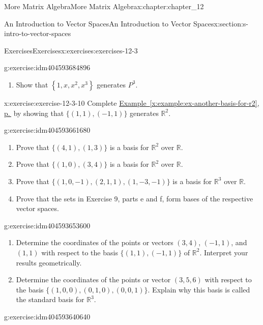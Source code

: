 \documentclass[twoside,10pt,]{book}
\newcommand{\xreffont}{\relax}
\numberwithin{equation}{section}
\begin{document}
\begin{chapterptx}{More Matrix Algebra}{}{More Matrix Algebra}{}{}{x:chapter:chapter_12}
\begin{sectionptx}{An Introduction to Vector Spaces}{}{An Introduction to Vector Spaces}{}{}{x:section:s-intro-to-vector-spaces}
\begin{exercises-subsection}{Exercises}{}{Exercises}{}{}{x:exercises:exercises-12-3}
\begin{divisionexercise}{9}{}{}{g:exercise:idm404593684896}
\begin{enumerate}[label=(\alph*)]
\begin{equation*}
\begin{array}{cc}
0 & 0 \\
0 & 1 \\
\end{array}
\right)\}
\end{equation*}
generates \(M_{2\times 2}(\mathbb{R})\)%
\item{}Show that \(\left\{1,x,x^2 ,x^3\right\}\) generates \(P^3\).%
\end{enumerate}
%
\end{divisionexercise}%
\begin{divisionexercise}{10}{}{}{x:exercise:exercise-12-3-10}%
Complete \hyperref[x:example:ex-another-basis-for-r2]{Example~{\xreffont\ref{x:example:ex-another-basis-for-r2}}, p.\,\pageref{x:example:ex-another-basis-for-r2}} by showing that \(\{(1, 1), (-1, 1)\}\) generates \(\mathbb{R}^2\).%
\end{divisionexercise}%
\begin{divisionexercise}{11}{}{}{g:exercise:idm404593661680}%
%
\begin{enumerate}[label=(\alph*)]
\item{}Prove that \(\{(4, 1), (1, 3)\}\) is a basis for \(\mathbb{R}^2\) over \(\mathbb{R}\).%
\item{}Prove that \(\{(1, 0), (3, 4)\}\) is a basis for \(\mathbb{R}^2\) over \(\mathbb{R}\).%
\item{}Prove that \(\{(1,0, -1), (2, 1, 1), (1, -3, -1)\}\) is a basis for \(\mathbb{R}^3\) over \(\mathbb{R}\).%
\item{}Prove that the sets in Exercise 9, parts e and f, form bases of the respective vector spaces.%
\end{enumerate}
%
\end{divisionexercise}%
\begin{divisionexercise}{12}{}{}{g:exercise:idm404593653600}%
%
\begin{enumerate}[label=(\alph*)]
\item{}Determine the coordinates of the points or vectors \((3, 4)\), \((-1, 1)\), and \((1, 1)\) with respect to the basis \(\{(1, 1),(-1, 1)\}\) of \(\mathbb{R}^2\). Interpret your results geometrically.%
\item{}Determine the coordinates of the points or vector \((3, 5, 6)\) with respect to the basis \(\{(1, 0, 0), (0, 1, 0), (0, 0, 1)\}\). Explain why this basis is called the standard basis for \(\mathbb{R}^3\).%
\end{enumerate}
%
\end{divisionexercise}%
\begin{divisionexercise}{13}{}{}{g:exercise:idm404593640640}%

\end{divisionexercise}
\end{exercises-subsection}
\end{sectionptx}
\end{chapterptx}
\end{document}
